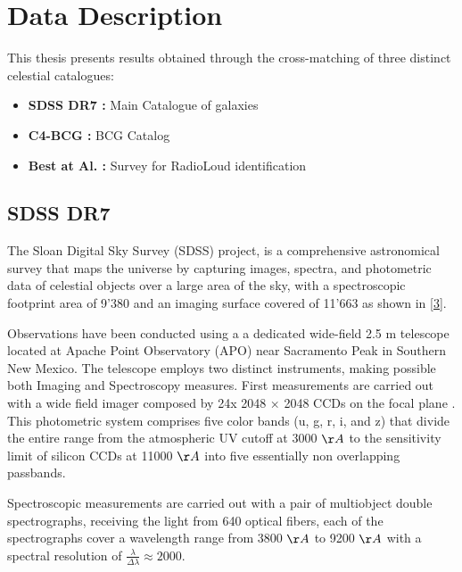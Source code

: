 \section{Data Description}
This thesis presents results obtained through the cross-matching of three distinct celestial catalogues:
\begin{itemize}
	\item\textbf{SDSS DR7 :}  Main Catalogue of galaxies \cite{2009ApJS..182..543A,mpa-sdss-dr7}
	\item \textbf{C4-BCG :}  BCG Catalog \cite{2009yCat..73790867V}
	\item \textbf{Best at Al. :}   Survey for RadioLoud identification \cite{2005MNRAS.362....9B}
\end{itemize}

\subsection{SDSS DR7}
The Sloan Digital Sky Survey (SDSS) project, is a comprehensive astronomical survey that maps the universe by capturing images, spectra, and photometric data of celestial objects over a large area of the sky, with a spectroscopic footprint area of 9'380  and an imaging surface covered of  11'663  \cite{2009ApJS..182..543A} as shown in \autoref{3}.

Observations have been conducted using a a dedicated wide-field 2.5 m telescope \cite{2006AJ....131.2332G} located at Apache Point Observatory (APO) near Sacramento Peak in Southern New Mexico. The telescope employs two distinct instruments, making possible both Imaging and Spectroscopy measures. First measurements are carried out with a wide field imager composed by 24x 2048 × 2048 CCDs on the focal plane \cite{1998AJ....116.3040G}.
This photometric system comprises five color bands (u, g, r, i, and z) that divide the entire range from the atmospheric UV cutoff at 3000 $\AA$ to the sensitivity limit of silicon CCDs at 11000  $\AA$ into five essentially non overlapping passbands.

Spectroscopic measurements are carried out with a pair of multiobject double spectrographs, receiving the light from 640 optical fibers, each of the spectrographs cover a wavelength range from 3800 $\AA$ to 9200 $\AA$ with a spectral resolution of $\frac{\lambda}{\Delta \lambda} \approx 2000$. \cite{2009ApJS..182..543A}
\vspace{0.5cm}

